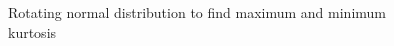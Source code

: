 \documentclass[a4paper,english]{article}
\begin{document}
\begin{figure}
\caption{Rotating normal distribution to find maximum and minimum kurtosis}
\end{figure}

\begin{figure}
\centering
{}\qquad
{} \\

\end{figure}
\end{document}
